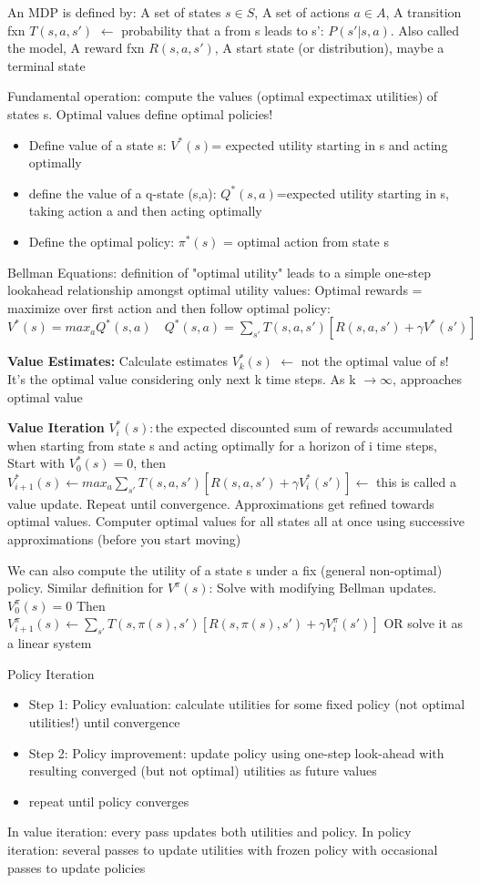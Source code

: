 \documentclass[10pt,twocolumn]{article}
\begin{document}
		An MDP is defined by: A set of states $s \in S$, A set of actions $a \in A$, A transition fxn $T(s,a,s')$ $\leftarrow$ probability that a from s leads to s': $P(s' | s, a)$. Also called the model,  A reward fxn $R(s,a,s')$, A start state (or distribution), maybe a terminal state

	Fundamental operation: compute the values (optimal expectimax utilities) of states s. Optimal values define optimal policies!
	\begin{itemize}
		\item Define value of a state s: $V^*(s)$= expected utility starting in s and acting optimally
		\item define the value of a q-state (s,a): $Q^*(s,a)$=expected utility starting in s, taking action a and then acting optimally
		\item Define the optimal policy: $\pi^*(s)$ = optimal action from state s
	\end{itemize}
	Bellman Equations: definition of "optimal utility" leads to a simple one-step lookahead relationship amongst optimal utility values: Optimal rewards = maximize over first action and then follow optimal policy:
$V^*(s) = max_a Q^*(s,a) \quad Q^*(s,a) = \displaystyle\sum_{s'}T(s,a,s')[R(s,a,s')+\gamma V^*(s')]$

	\textbf{Value Estimates: }Calculate estimates $V_k^*(s)$ $\leftarrow$ not the optimal value of s! It's the optimal value considering only next k time steps. As k $\rightarrow\infty$, approaches optimal value

\textbf{Value Iteration}	
 $V_i^*(s):$the expected discounted sum of rewards accumulated when starting from state s and acting optimally for a horizon of i time steps,  Start with $V_0^*(s)=0$, then $V^*_{i+1}(s)\leftarrow max_a \displaystyle\sum_{s'}T(s,a,s')[R(s,a,s')+\gamma V_i^*(s')] \leftarrow$ this is called a value update. Repeat until convergence. Approximations get refined towards optimal values. Computer optimal values for all states all at once using successive approximations (before you start moving)

	We can also compute the utility of a state s under a fix (general non-optimal) policy. Similar definition for $V^\pi(s)$:
Solve with modifying Bellman updates.
		$V_0^\pi(s)=0$
		Then $V_{i+1}^\pi(s)\leftarrow \displaystyle\sum_{s'}T(s,\pi(s),s')[R(s,\pi(s),s')+\gamma V_i^\pi(s')]$
		 OR solve it as a linear system

	Policy Iteration
	\begin{itemize}
		\item Step 1: Policy evaluation: calculate utilities for some fixed policy (not optimal utilities!) until convergence
		\item Step 2: Policy improvement: update policy using one-step look-ahead with resulting converged (but not optimal) utilities as future values
		\item repeat until policy converges
	\end{itemize}
	In value iteration: every pass updates both utilities and policy. In policy iteration: several passes to update utilities with frozen policy with occasional passes to update policies
\end{document}
